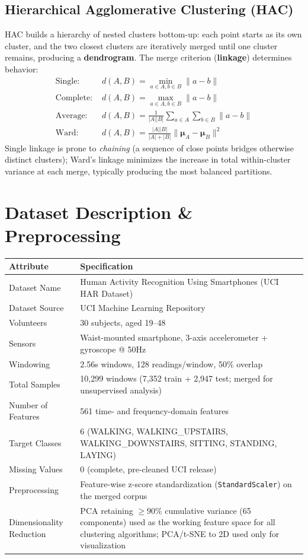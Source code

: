 \documentclass[12pt,a4paper]{article}
\begin{document}
\subsection{Hierarchical Agglomerative Clustering (HAC)}
HAC builds a hierarchy of nested clusters bottom-up: each point starts as its own cluster, and the two closest clusters are iteratively merged until one cluster remains, producing a \textbf{dendrogram}. The merge criterion (\textbf{linkage}) determines behavior:
\begin{align}
\text{Single: } & d(A,B) = \min_{a \in A, b \in B} \lVert a - b \rVert \\
\text{Complete: } & d(A,B) = \max_{a \in A, b \in B} \lVert a - b \rVert \\
\text{Average: } & d(A,B) = \frac{1}{|A||B|}\sum_{a \in A}\sum_{b \in B} \lVert a - b \rVert \\
\text{Ward: } & d(A,B) = \frac{|A||B|}{|A|+|B|} \lVert \boldsymbol{\mu}_A - \boldsymbol{\mu}_B \rVert^2
\end{align}
Single linkage is prone to \textit{chaining} (a sequence of close points bridges otherwise distinct clusters); Ward's linkage minimizes the increase in total within-cluster variance at each merge, typically producing the most balanced partitions.

\section{Dataset Description \& Preprocessing}
\begin{longtable}{|p{5.5cm}|p{8.5cm}|}
\hline
\textbf{Attribute} & \textbf{Specification} \\ \hline
\endhead
Dataset Name & Human Activity Recognition Using Smartphones (UCI HAR Dataset) \\ \hline
Dataset Source & UCI Machine Learning Repository \\ \hline
Volunteers & 30 subjects, aged 19--48 \\ \hline
Sensors & Waist-mounted smartphone, 3-axis accelerometer + gyroscope @ 50Hz \\ \hline
Windowing & 2.56s windows, 128 readings/window, 50\% overlap \\ \hline
Total Samples & 10,299 windows (7,352 train + 2,947 test; merged for unsupervised analysis) \\ \hline
Number of Features & 561 time- and frequency-domain features \\ \hline
Target Classes & 6 (WALKING, WALKING\_UPSTAIRS, WALKING\_DOWNSTAIRS, SITTING, STANDING, LAYING) \\ \hline
Missing Values & 0 (complete, pre-cleaned UCI release) \\ \hline
Preprocessing & Feature-wise z-score standardization (\texttt{StandardScaler}) on the merged corpus \\ \hline
Dimensionality Reduction & PCA retaining $\ge 90\%$ cumulative variance (65 components) used as the working feature space for all clustering algorithms; PCA/t-SNE to 2D used only for visualization \\ \hline
\end{longtable}
\end{document}
